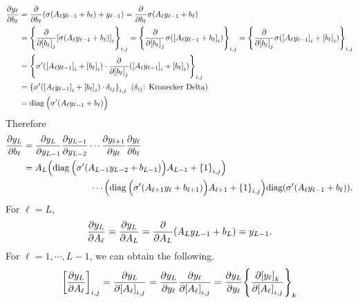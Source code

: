 \documentclass[10pt]{article}
\begin{document}
\begin{enumerate}[(1), leftmargin=*]
    \begin{align*}
        \frac{\partial y_\ell}{\partial b_\ell} &= \frac{\partial}{\partial b_\ell}\qty(\sigma\qty(A_\ell y_{\ell-1} + b_\ell) + y_{\ell-1}) = \frac{\partial}{\partial b_\ell}\sigma\qty(A_\ell y_{\ell-1} + b_\ell) \\
        &= \qty{\frac{\partial}{\partial\qty[b_\ell]_j}\qty[\sigma\qty(A_\ell y_{\ell-1} + b_\ell)]_i}_{i, j} = \qty{\frac{\partial}{\partial\qty[b_\ell]_j}\sigma\qty(\qty[A_\ell y_{\ell-1} + b_\ell]_i)}_{i, j} = \qty{\frac{\partial}{\partial\qty[b_\ell]_j}\sigma\qty(\qty[A_\ell y_{\ell-1}]_i + \qty[b_\ell]_i)}_{i, j} \\
        &= \qty{\sigma'\qty(\qty[A_\ell y_{\ell-1}]_i + \qty[b_\ell]_i)\cdot\frac{\partial}{\partial\qty[b_\ell]_j}\qty(\qty[A_\ell y_{\ell-1}]_i + \qty[b_\ell]_i)}_{i, j} \\
        &= \qty{\sigma'\qty(\qty[A_\ell y_{\ell-1}]_i + \qty[b_\ell]_i)\cdot\delta_{ij}}_{i, j} \;\; (\delta_{ij} \text{: Kronecker Delta})\\
        &= \text{diag}\:\Big(\sigma'\qty(A_\ell y_{\ell-1} + b_\ell)\Big)
    \end{align*}
    Therefore 
    \begin{align*}
        \frac{\partial y_L}{\partial b_\ell} &= \frac{\partial y_L}{\partial y_{L-1}}\frac{\partial y_{L-1}}{\partial y_{L-2}}\cdots\frac{\partial y_{\ell+1}}{\partial y_{\ell}}\frac{\partial y_\ell}{\partial b_\ell} \\
        &= A_L\qty(\text{diag}\:\Big(\sigma'\qty(A_{L-1} y_{L-2} + b_{L-1})\Big) A_{L-1} + \qty{1}_{i, j}) \\
        &\;\;\;\;\;\;\;\;\;\;\;\;\;\;\;\;\;\;\;\;\;\;\;\;\;\;\;\cdots\qty(\text{diag}\:\Big(\sigma'\qty(A_{\ell+1} y_{\ell} + b_{\ell+1})\Big) A_{\ell+1} + \qty{1}_{i, j})\text{diag}\qty(\sigma'\qty(A_\ell y_{\ell-1} + b_\ell)).
    \end{align*}
    For $\ell = L$,
    \begin{align*}
        \frac{\partial y_L}{\partial A_\ell} = \frac{\partial y_L}{\partial A_L} = \frac{\partial}{\partial A_L}\qty(A_L y_{L-1} + b_L) = y_{L-1}.
    \end{align*}
    For $\ell = 1, \cdots, L-1$, we can obtain the following.
    \begin{align*}
        \qty[\frac{\partial y_L}{\partial A_\ell}]_{i, j} &= \frac{\partial y_L}{\partial \qty[A_\ell]_{i, j}} = \frac{\partial y_L}{\partial y_\ell}\frac{\partial y_\ell}{\partial \qty[A_\ell]_{i, j}} = \frac{\partial y_L}{\partial y_\ell}\qty{\frac{\partial\qty[y_\ell]_k}{\partial \qty[A_\ell]_{i, j}}}_{k} \\

\end{align*}
\end{enumerate}
\end{document}
